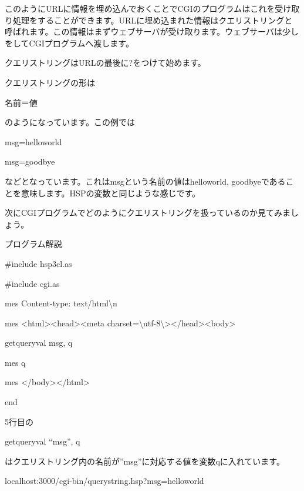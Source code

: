 \documentclass[a4paper,12pt,dvipdfmx]{jarticle}
\begin{document}
このようにURLに情報を埋め込んでおくことでCGIのプログラムはこれを受け取り処理をすることができます。URLに埋め込まれた情報はクエリストリングと呼ばれます。この情報はまずウェブサーバが受け取ります。ウェブサーバは少しをしてCGIプログラムへ渡します。

クエリストリングはURLの最後に?をつけて始めます。

クエリストリングの形は

名前＝値

のようになっています。この例では

msg=helloworld

msg=goodbye

などとなっています。これはmsgという名前の値はhelloworld,
goodbyeであることを意味します。HSPの変数と同じような感じです。

次にCGIプログラムでどのようにクエリストリングを扱っているのか見てみましょう。


\bigskip

プログラム解説



\centering
\begin{boxedminipage}{16.233cm}
	\#include {\textquotedbl}hsp3cl.as{\textquotedbl}

	\#include {\textquotedbl}cgi.as{\textquotedbl}

	mes {\textquotedbl}Content-type: text/html{\textbackslash}n{\textquotedbl}

	mes {\textquotedbl}{\textless}html{\textgreater}{\textless}head{\textgreater}{\textless}meta
	charset={\textbackslash}{\textquotedbl}utf-8{\textbackslash}{\textquotedbl}{\textgreater}{\textless}/head{\textgreater}{\textless}body{\textgreater}{\textquotedbl}

	getqueryval {\textquotedbl}msg{\textquotedbl}, q

	mes q

	mes {\textquotedbl}{\textless}/body{\textgreater}{\textless}/html{\textgreater}{\textquotedbl}

	end
\end{boxedminipage}
\flushleft


\bigskip


\bigskip

5行目の

getqueryval “msg”, q

はクエリストリング内の名前が”msg”に対応する値を変数qに入れています。

localhost:3000/cgi-bin/querystring.hsp?msg=helloworld
\end{document}
